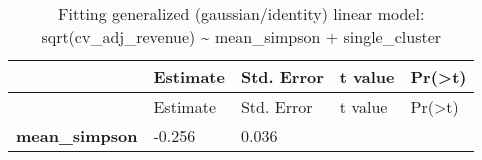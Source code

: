 \documentclass[]{article}
\begin{document}
\begin{longtable}[c]{@{}lllll@{}}
\caption{Fitting generalized (gaussian/identity) linear model:
sqrt(cv\_adj\_revenue) \textasciitilde{} mean\_simpson +
single\_cluster}\tabularnewline
\toprule
\begin{minipage}[b]{0.31\columnwidth}\raggedright\strut
~
\strut\end{minipage} &
\begin{minipage}[b]{0.13\columnwidth}\raggedright\strut
Estimate
\strut\end{minipage} &
\begin{minipage}[b]{0.16\columnwidth}\raggedright\strut
Std. Error
\strut\end{minipage} &
\begin{minipage}[b]{0.12\columnwidth}\raggedright\strut
t value
\strut\end{minipage} &
\begin{minipage}[b]{0.12\columnwidth}\raggedright\strut
Pr(\textgreater{}\textbar{}t\textbar{})
\strut\end{minipage}\tabularnewline
\midrule
\endfirsthead
\toprule
\begin{minipage}[b]{0.31\columnwidth}\raggedright\strut
~
\strut\end{minipage} &
\begin{minipage}[b]{0.13\columnwidth}\raggedright\strut
Estimate
\strut\end{minipage} &
\begin{minipage}[b]{0.16\columnwidth}\raggedright\strut
Std. Error
\strut\end{minipage} &
\begin{minipage}[b]{0.12\columnwidth}\raggedright\strut
t value
\strut\end{minipage} &
\begin{minipage}[b]{0.12\columnwidth}\raggedright\strut
Pr(\textgreater{}\textbar{}t\textbar{})
\strut\end{minipage}\tabularnewline
\midrule
\endhead
\begin{minipage}[t]{0.31\columnwidth}\raggedright\strut
\textbf{mean\_simpson}
\strut\end{minipage} &
\begin{minipage}[t]{0.13\columnwidth}\raggedright\strut
-0.256
\strut\end{minipage} &
\begin{minipage}[t]{0.16\columnwidth}\raggedright\strut
0.036
\strut\end{minipage} &
\begin{minipage}[t]{0.12\columnwidth}\raggedright\strut

\end{minipage}
\end{longtable}
\end{document}

